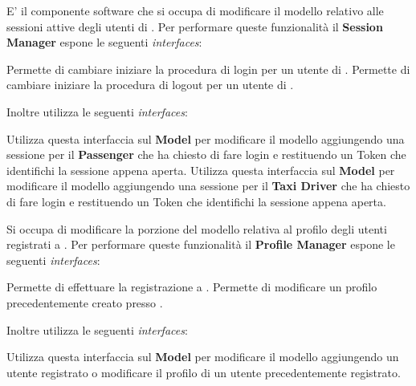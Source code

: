 \begin{itemize}
\begin{itemize}
		 E' il componente software che si occupa di modificare il modello relativo alle sessioni attive degli utenti di \myTaxiService{}.
		Per performare queste funzionalità il \textbf{Session Manager} espone le seguenti \textit{interfaces}:
		\begin{itemize}
			 Permette di cambiare iniziare la procedura di login per un utente di \myTaxiService{}.
			 Permette di cambiare iniziare la procedura di logout per un utente di \myTaxiService{}.
		\end{itemize}
		Inoltre utilizza le seguenti \textit{interfaces}:
		\begin{itemize}
			 Utilizza questa interfaccia sul \textbf{Model} per modificare il modello aggiungendo una sessione per il \textbf{Passenger} che ha chiesto di fare login e restituendo un Token che identifichi la sessione appena aperta.
			 Utilizza questa interfaccia sul \textbf{Model} per modificare il modello aggiungendo una sessione per il \textbf{Taxi Driver} che ha chiesto di fare login e restituendo un Token che identifichi la sessione appena aperta.
		\end{itemize}
		
		 Si occupa di modificare la porzione del modello relativa al profilo degli utenti registrati a \myTaxiService{}.
		Per performare queste funzionalità il \textbf{Profile Manager} espone le seguenti \textit{interfaces}:
		\begin{itemize}
			 Permette di effettuare la registrazione a \myTaxiService{}.
			 Permette di modificare un profilo precedentemente creato presso \myTaxiService{}.
		\end{itemize}
		Inoltre utilizza le seguenti \textit{interfaces}:
		\begin{itemize}
			 Utilizza questa interfaccia sul \textbf{Model} per modificare il modello aggiungendo un utente registrato o modificare il profilo di un utente precedentemente registrato.
		\end{itemize}
		

\end{itemize}
\end{itemize}
